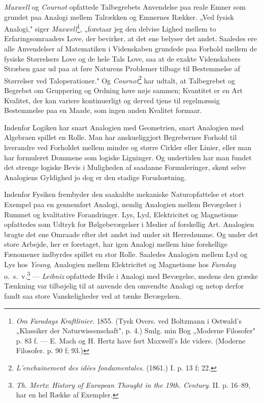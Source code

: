 \documentclass[12pt,a4paper]{book}
\newcommand{\opage}[1]{\marginnote{\footnotesize\textit{[#1]}}}
\begin{document}
\emph{Maxwell} og \emph{Cournot} opfattede Talbegrebets Anvendelse paa
reale Emner som grundet paa Analogi mellem Talrækken og Emnernes
Rækker. „Ved fysisk Analogi," siger \emph{Maxwell}\footnote{\emph{Om
Faradays Kraftlinier}. 1855. (Tysk Overs. ved Boltzmann i Ostwald's
„Klassiker der Naturwissenschaft", p. 4.) Smlg. min Bog „Moderne
Filosofer" p. 83 f. --- E. Mach og H. Hertz have ført Maxwell's Ide videre. (Moderne Filosofer. p. 90 f; 93.)}, „forstaar jeg den delvise
Lighed mellem to Erfaringsomraaders Love, der bevirker, at det ene
belyser det andet. Saaledes ere alle Anvendelser af Matematiken i
Videnskaben grundede paa Forhold mellem de fysiske Størrelsers Love og
de hele Tals Love, saa at de exakte Videnskabers Stræben gaar ud paa at
føre Naturens Problemer tilbage til Bestemmelse af Størrelser ved
Taloperationer." \opage{184} Og \emph{Cournot}\footnote{\emph{L'enchainement des
idées fondamentales}. (1861.) I. p. 13 f; 22.} har udtalt, at
Talbegrebet og Begrebet om Gruppering og Ordning høre nøje sammen;
Kvantitet er en Art Kvalitet, der kan variere kontinuerligt og derved
tjene til regelmæssig Bestemmelse paa en Maade, som ingen anden Kvalitet
formaar.

Indenfor Logiken har snart Analogien med Geometrien, snart Analogien med
Algebraen spillet en Rolle. Man har anskueliggjort Begrebernes Forhold
til hverandre ved Forholdet mellem mindre og større Cirkler eller
Linier, eller man har formuleret Dommene som logiske Ligninger. Og
undertiden har man fundet det strenge logiske Bevis i Muligheden af
saadanne Formuleringer, skønt selve Analogiens Gyldighed jo dog er den
stadige Forudsætning.

Indenfor Fysiken frembyder den saakaldte mekaniske Naturopfattelse et
stort Exempel paa en gennemført Analogi, nemlig Analogien mellem
Bevægelser i Rummet og kvalitative Forandringer. Lys, Lyd, Elektricitet
og Magnetisme opfattedes som Udtryk for Bølgebevægelser i Medier af
forskellig Art. Analogien bragte det ene Omraade efter det andet ind
under sit Herredømme. Og under det store Arbejde, her er foretaget, har
igen Analogi mellem hine forskellige Fænomener indbyrdes spillet en stor
Rolle. Saaledes Analogien mellem Lyd og Lys hos \emph{Young}, Analogien
mellem Elektricitet og Magnetisme hos \emph{Faraday} o.\ s.\
v.\footnote{\emph{Th. Mertz}: \emph{History of European Thought in the
19th. Century}. II. p. 16--89, har en hel Række af Exempler.} ---
\emph{Leibniz} opfattede Hvile i Analogi med Bevægelse, medens den
græske Tænkning var tilbøjelig til at anvende den omvendte Analogi og
netop derfor fandt saa store Vanskeligheder ved at tænke Bevægelsen.
\end{document}
